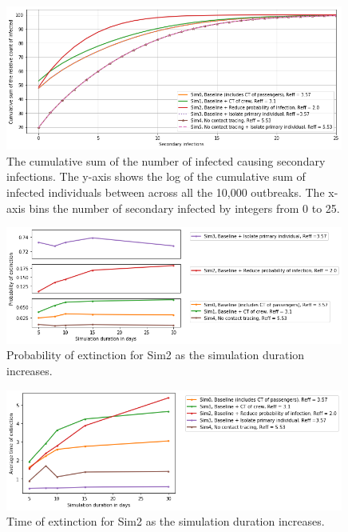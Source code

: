 \documentclass[sr]{drdc-report}
\begin{document}
\begin{figure}
  \includegraphics[width=0.99\textwidth, keepaspectratio=true]{figures/DP_cumDistReff}
  \caption{The cumulative sum of the number of infected causing secondary infections. The y-axis shows the log of the cumulative sum of infected individuals between across all the 10,000 outbreaks. The x-axis bins the number of secondary infected by integers from 0 to 25.}\label{fig_DP_cumDistReff}
\end{figure}

\begin{figure}
  \includegraphics[width=0.99\textwidth, keepaspectratio=true]{figures/DP_pextTime}
  \caption{Probability of extinction for Sim2 as the simulation duration increases.}\label{fig_DP_pextTime}
\end{figure}

\begin{figure}
  \includegraphics[width=0.99\textwidth, keepaspectratio=true]{figures/DP_textTime}
  \caption{Time of extinction for Sim2 as the simulation duration increases.}\label{fig_DP_textTime}
\end{figure}
\end{document}
